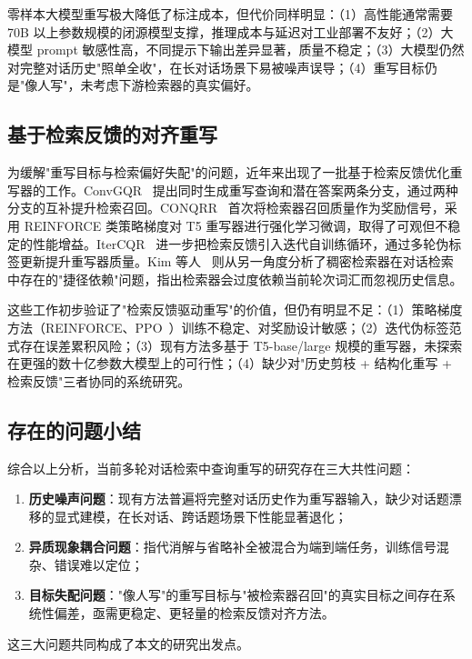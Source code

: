 零样本大模型重写极大降低了标注成本，但代价同样明显：（1）高性能通常需要 70B 以上参数规模的闭源模型支撑，推理成本与延迟对工业部署不友好；（2）大模型 prompt 敏感性高，不同提示下输出差异显著，质量不稳定；（3）大模型仍然对完整对话历史"照单全收"，在长对话场景下易被噪声误导；（4）重写目标仍是"像人写"，未考虑下游检索器的真实偏好。

\subsection{基于检索反馈的对齐重写}

为缓解"重写目标与检索偏好失配"的问题，近年来出现了一批基于检索反馈优化重写器的工作。ConvGQR~\citep{mo2023convgqr} 提出同时生成重写查询和潜在答案两条分支，通过两种分支的互补提升检索召回。CONQRR~\citep{wu2022conqrr} 首次将检索器召回质量作为奖励信号，采用 REINFORCE 类策略梯度对 T5 重写器进行强化学习微调，取得了可观但不稳定的性能增益。IterCQR~\citep{jang2024itercqr} 进一步把检索反馈引入迭代自训练循环，通过多轮伪标签更新提升重写器质量。Kim 等人~\citep{kim2022saving} 则从另一角度分析了稠密检索器在对话检索中存在的"捷径依赖"问题，指出检索器会过度依赖当前轮次词汇而忽视历史信息。

这些工作初步验证了"检索反馈驱动重写"的价值，但仍有明显不足：（1）策略梯度方法（REINFORCE、PPO~\citep{schulman2017ppo}）训练不稳定、对奖励设计敏感；（2）迭代伪标签范式存在误差累积风险；（3）现有方法多基于 T5-base/large 规模的重写器，未探索在更强的数十亿参数大模型上的可行性；（4）缺少对"历史剪枝 + 结构化重写 + 检索反馈"三者协同的系统研究。

\subsection{存在的问题小结}

综合以上分析，当前多轮对话检索中查询重写的研究存在三大共性问题：

\begin{enumerate}
    \item \textbf{历史噪声问题}：现有方法普遍将完整对话历史作为重写器输入，缺少对话题漂移的显式建模，在长对话、跨话题场景下性能显著退化；
    \item \textbf{异质现象耦合问题}：指代消解与省略补全被混合为端到端任务，训练信号混杂、错误难以定位；
    \item \textbf{目标失配问题}："像人写"的重写目标与"被检索器召回"的真实目标之间存在系统性偏差，亟需更稳定、更轻量的检索反馈对齐方法。
\end{enumerate}

这三大问题共同构成了本文的研究出发点。

